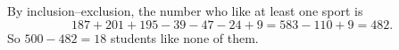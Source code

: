 By inclusion--exclusion, the number who like at least one sport is
\[
187+201+195-39-47-24+9=583-110+9=482 .
\]
So $500-482=\boxed{18}$ students like none of them.
